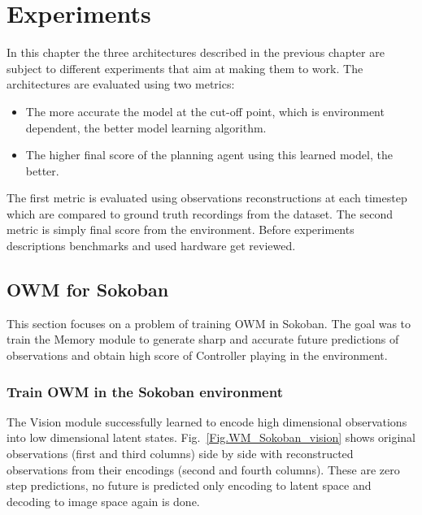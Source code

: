 \section{Experiments}

In this chapter the three architectures described in the previous chapter are subject to different experiments that aim at making them to work. The architectures are evaluated using two metrics:
\begin{itemize}
\item The more accurate the model at the cut-off point, which is environment dependent, the better model learning algorithm.
\item The higher final score of the planning agent using this learned model, the better.
\end{itemize}
The first metric is evaluated using observations reconstructions at each timestep which are compared to ground truth recordings from the dataset. The second metric is simply final score from the environment.
Before experiments descriptions benchmarks and used hardware get reviewed.

\subsection{OWM for Sokoban}

This section focuses on a problem of training OWM in Sokoban. The goal was to train the Memory module to generate sharp and accurate future predictions of observations and obtain high score of Controller playing in the environment.

\subsubsection{Train OWM in the Sokoban environment}

The Vision module successfully learned to encode high dimensional observations into low dimensional latent states. Fig.~\ref{Fig.WM_Sokoban_vision} shows original observations (first and third columns) side by side with reconstructed observations from their encodings (second and fourth columns). These are zero step predictions, no future is predicted only encoding to latent space and decoding to image space again is done.

